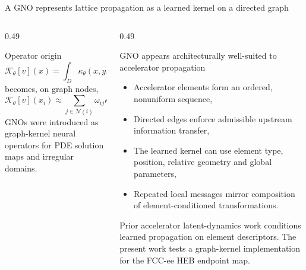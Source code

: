 \begin{frame}[t,shrink=5]{A GNO represents lattice propagation as a learned kernel on a directed graph}
\begin{columns}[T,onlytextwidth]
\begin{column}{0.49\textwidth}
\begin{block}{Operator origin}
\[\mathcal K_\theta[v](x)=\int_D\kappa_\theta(x,y,\mu)v(y)\,\mathrm d\nu(y)\]
becomes, on graph nodes,
\[\mathcal K_\theta[v](x_i)\approx\sum_{j\in\mathcal N(i)}\omega_{ij}\kappa_\theta(x_i,x_j,\mu)v_j.\]
GNOs were introduced as graph-kernel neural operators for PDE solution maps and irregular domains.
\end{block}

\end{column}
\begin{column}{0.49\textwidth}
\begin{block}{GNO appears architecturally well-suited to accelerator propagation}
\begin{itemize}
\item Accelerator elements form an ordered, nonuniform sequence,
\item Directed edges enforce admissible upstream information transfer,
\item The learned kernel can use element type, position, relative geometry and global parameters,
\item Repeated local messages mirror composition of element-conditioned transformations.
\end{itemize}
\end{block}
{\scriptsize Prior accelerator latent-dynamics work conditions learned propagation on element descriptors. The present work tests a graph-kernel implementation for the FCC-ee HEB endpoint map.\par}
\end{column}
\end{columns}


\end{frame}

